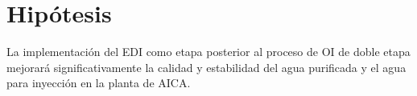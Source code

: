 \section*{ Hipótesis}
La implementación del EDI como etapa posterior al proceso de OI de doble etapa mejorará significativamente la calidad y estabilidad del agua purificada y el agua para inyección en la planta de AICA.